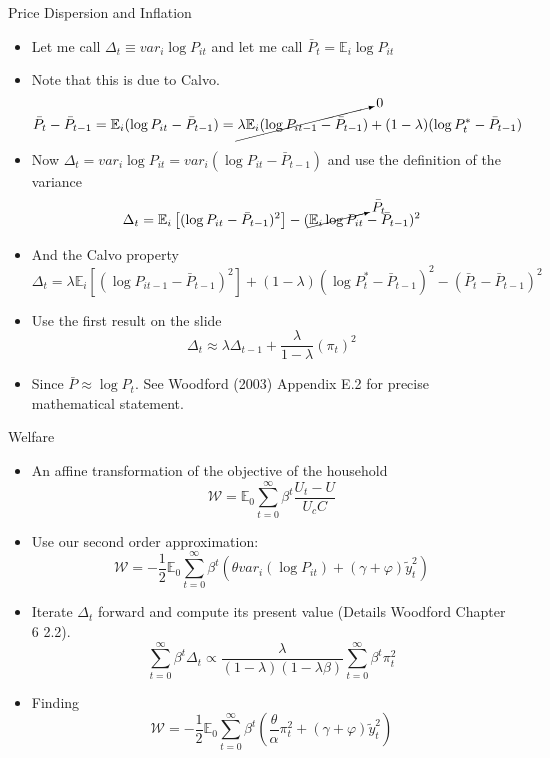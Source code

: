 \documentclass[11pt,aspectratio=169,xcolor={dvipsnames},hyperref={pdftex,pdfpagemode=UseNone,hidelinks,pdfdisplaydoctitle=true},usepdftitle=false]{beamer}
\begin{document}
\begin{frame}{Price Dispersion and Inflation}
\begin{itemize}
\item Let me call $\Delta_t \equiv	var_i \log P_{it}$ and let me call $\bar{P}_t = \mathbb{E}_i \log P_{it}$
\item Note that this is due to Calvo.
$$\bar{P}_t - \bar{P}_{t-1} = \mathbb{E}_i (\log P_{it} - \bar{P}_{t-1}) = \cancelto{0}{\lambda \mathbb{E}_i (\log P_{it-1} - \bar{P}_{t-1})} + (1-\lambda)(\log P^*_t - \bar{P}_{t-1}) $$
\item Now $\Delta_t = var_i \log P_{it} = var_i (\log P_{it} - \bar{P}_{t-1})$ and use the definition of the variance
$$\Delta_t = \mathbb{E}_i \left[ (\log P_{it} - \bar{P}_{t-1})^2 \right] - (\cancelto{\bar{P}_t}{\mathbb{E}_i \log P_{it}} - \bar{P}_{t-1})^2$$
\item And the Calvo property
$$\Delta_t = \lambda \mathbb{E}_i \left[ (\log P_{it-1} - \bar{P}_{t-1})^2 \right] + (1-\lambda)(\log P_t^* - \bar{P}_{t-1})^2 -  (\bar{P}_t - \bar{P}_{t-1})^2$$
\item Use the first result on the slide
$$\Delta_t \approx \lambda \Delta_{t-1} + \frac{\lambda}{1-\lambda}  (\pi_t)^2$$
\item Since $\bar{P} \approx \log P_t$. See Woodford (2003) Appendix E.2 for precise mathematical statement.
\end{itemize}
\end{frame}

\begin{frame}{Welfare}
\begin{itemize}
\item An affine transformation of the objective of the household
$$\mathcal{W} = \mathbb{E}_0 \sum_{t=0}^{\infty} \beta^t \frac{U_t - U}{U_c C}$$
\item Use our second order approximation:
$$\mathcal{W} = -\frac{1}{2 }\mathbb{E}_0 \sum_{t=0}^{\infty} \beta^t \left(\theta var_i ( \log P_{it}) + (\gamma + \varphi) \tilde{y}^2_t \right)$$
\item Iterate $\Delta_t$ forward and compute its present value (Details Woodford Chapter 6 2.2).
$$\sum_{t=0}^{\infty} \beta^t \Delta_t \propto \frac{\lambda}{(1-\lambda)(1-\lambda\beta)} \sum_{t=0}^{\infty} \beta^t \pi^2_t$$
\item Finding
$$\mathcal{W} = -\frac{1}{2 }\mathbb{E}_0 \sum_{t=0}^{\infty} \beta^t \left(\frac{\theta}{\alpha}\pi^2_t + (\gamma + \varphi) \tilde{y}^2_t \right)$$
\end{itemize}
\end{frame}
\end{document}
